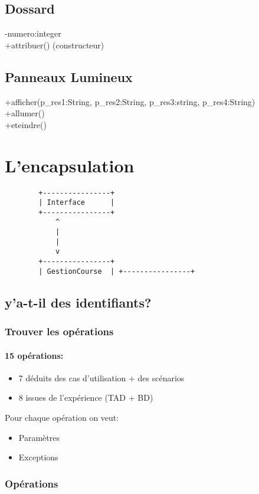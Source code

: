 \documentclass{article}
\begin{document}
	\subsection{Dossard}
	-numero:integer\\
	+attribuer() (constructeur)\\

	\subsection{Panneaux Lumineux}
	+afficher(p\_res1:String, p\_res2:String, p\_res3:string, p\_res4:String)	\\
	+allumer()\\
	+eteindre()\\

	\section{L'encapsulation}
	\begin{verbatim}
		+----------------+
		| Interface      |
		+----------------+
	        ^
	        |
	        |
	        v
		+----------------+
		| GestionCourse  | +----------------+
	\end{verbatim}
	\subsection{y'a-t-il des identifiants?}
		\subsubsection{Trouver les opérations}
		\paragraph{15 opérations:}
		\begin{itemize}
			\item 7 déduits des cas d'utilisation + des scénarios
			\item 8 issues de l'expérience (TAD + BD)
		\end{itemize}
		Pour chaque opération on veut: 
		\begin{itemize}
			\item Paramètres
			\item Exceptions
		\end{itemize}
		\subsubsection{Opérations}
		
\end{document}
